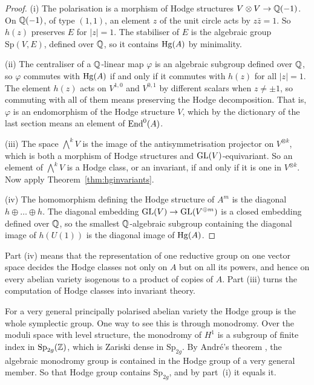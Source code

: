 \begin{proof}
(i) The polarisation is a morphism of Hodge structures
$V\otimes V\to\mathbb{Q}(-1)$. On $\mathbb{Q}(-1)$, of type $(1,1)$, an element $z$ of
the unit circle acts by $z\bar z=1$. So $h(z)$ preserves $E$ for $|z|=1$.
The stabiliser of $E$ is the algebraic group $\mathrm{Sp}(V,E)$, defined over
$\mathbb{Q}$, so it contains $\operatorname{Hg}(A)$ by minimality.

(ii) The centraliser of a $\mathbb{Q}$-linear map $\varphi$ is an algebraic
subgroup defined over $\mathbb{Q}$, so $\varphi$ commutes with $\operatorname{Hg}(A)$ if and only
if it commutes with $h(z)$ for all $|z|=1$. The element $h(z)$ acts on
$V^{1,0}$ and $V^{0,1}$ by different scalars when $z\ne\pm1$, so
commuting with all of them means preserving the Hodge decomposition. That
is, $\varphi$ is an endomorphism of the Hodge structure $V$, which by the
dictionary of the last section means an element of $\operatorname{End}^{0}(A)$.

(iii) The space $\bigwedge^{k}V$ is the image of the antisymmetrisation
projector on $V^{\otimes k}$, which is both a morphism of Hodge structures
and $\operatorname{GL}(V)$-equivariant. So an element of $\bigwedge^{k}V$ is a Hodge class,
or an invariant, if and only if it is one in $V^{\otimes k}$. Now apply
Theorem~\ref{thm:hginvariants}.

(iv) The homomorphism defining the Hodge structure of $A^{m}$ is the
diagonal $h\oplus\dots\oplus h$. The diagonal embedding
$\operatorname{GL}(V)\to\operatorname{GL}(V^{\oplus m})$ is a closed embedding defined over $\mathbb{Q}$, so the
smallest $\mathbb{Q}$-algebraic subgroup containing the diagonal image of $h(U(1))$
is the diagonal image of $\operatorname{Hg}(A)$.
\end{proof}

Part (iv) means that the representation of one reductive group on one
vector space decides the Hodge classes not only on $A$ but on all its
powers, and hence on every abelian variety isogenous to a product of
copies of $A$. Part (iii) turns the computation of Hodge classes into
invariant theory.

For a very general principally polarised abelian variety the Hodge group
is the whole symplectic group. One way to see this is through monodromy.
Over the moduli space with level structure, the monodromy of $H^{1}$ is a
subgroup of finite index in $\mathrm{Sp}_{2g}(\mathbb{Z})$, which is Zariski dense in
$\mathrm{Sp}_{2g}$. By Andr\'e's theorem \cite{And92}, the algebraic monodromy
group is contained in the Hodge group of a very general member. So that
Hodge group contains $\mathrm{Sp}_{2g}$, and by part~(i) it equals it.

